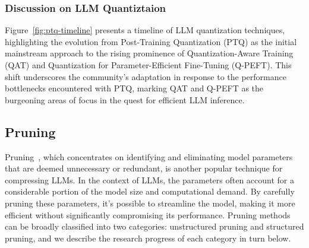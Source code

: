 \subsubsection{Discussion on LLM Quantiztaion}
Figure~\ref{fig:ptq-timeline} presents a timeline of LLM quantization techniques, highlighting the evolution from Post-Training Quantization (PTQ) as the initial mainstream approach to the rising prominence of Quantization-Aware Training (QAT) and Quantization for Parameter-Efficient Fine-Tuning (Q-PEFT). This shift underscores the community's adaptation in response to the performance bottlenecks encountered with PTQ, marking QAT and Q-PEFT as the burgeoning areas of focus in the quest for efficient LLM inference.



\subsection{Pruning}
Pruning~\citep{lecun1989optimal,liang2021pruning}, which concentrates on identifying and eliminating model parameters that are deemed unnecessary or redundant, is another popular technique for compressing LLMs.
In the context of LLMs, the parameters often account for a considerable portion of the model size and computational demand. By carefully pruning these parameters, it's possible to streamline the model, making it more efficient without significantly compromising its performance. 
Pruning methods can be broadly classified into two categories: unstructured pruning and structured pruning, and we describe the research progress of each category in turn below.


